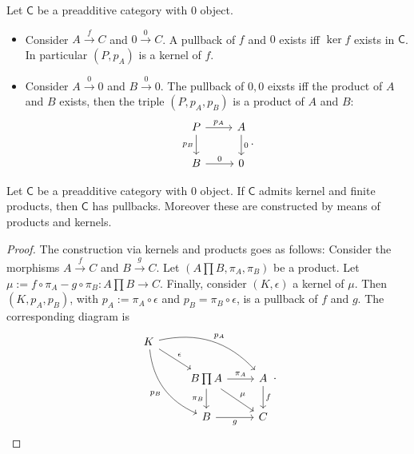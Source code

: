 \begin{ex}
	Let $\mathsf{C}$ be a preadditive category with $0$ object.
	\begin{itemize}
	\item Consider $A \xrightarrow{f} C$ and $0 \xrightarrow{0} C$.
		A pullback of $f$ and $0$ exists iff $\ker f$ exists in $\mathsf{C}$.
		In particular $\left(P, p_A\right)$ is a kernel of $f$.
	\item Consider $A \xrightarrow{0} 0$ and $B \xrightarrow{0} 0$.
		The pullback of $0, 0$ eixsts iff the product of $A$ and $B$ exists, then the triple $\left(P, p_A, p_B\right)$ is a product of $A$ and $B$:
		\begin{equation}
		\begin{tikzcd}
			P \arrow[r, "p_A", rightarrow] \arrow[d, "p_B"', rightarrow] & A \arrow[d, "0", rightarrow] \\
			B \arrow[r, "0", rightarrow] & 0
		\end{tikzcd}
		.\end{equation} 
	\end{itemize}
\end{ex} 

\begin{prop}
	Let $\mathsf{C}$ be a preadditive category with $0$ object.
	If $\mathsf{C}$ admits kernel and finite products, then $\mathsf{C}$ has pullbacks.
	Moreover these are constructed by means of products and kernels.
\end{prop} 
\begin{proof}
	The construction via kernels and products goes as follows:
	Consider the morphisms $A \xrightarrow{f} C$ and $B \xrightarrow{g} C$.
	Let $\left(A \prod B, \pi_A, \pi_B\right)$ be a product.
	Let $\mu := f \circ \pi_A - g \circ \pi_B: A \prod B \to C$.
	Finally, consider $\left(K, \epsilon\right)$ a kernel of $\mu$.
	Then $\left(K, p_A, p_B\right)$, with $p_A := \pi_A \circ \epsilon$ and $p_B = \pi_B \circ \epsilon$, is a pullback of $f$ and $g$.
	The corresponding diagram is
	\begin{equation}
	\begin{tikzcd}
		K \arrow[rd, "\epsilon", rightarrow] \arrow[rrd, "p_A", rightarrow, bend left] \arrow[rdd, "p_B"', rightarrow, bend right] & & \\
	   & B \prod A \arrow[r, "\pi_A", rightarrow] \arrow[d, "\pi_B"', rightarrow] \arrow[rd, "\mu", rightarrow] & A \arrow[d, "f", rightarrow] \\
	   & B \arrow[r, "g"', rightarrow] & C
	\end{tikzcd}
	.\end{equation} 
\end{proof}


